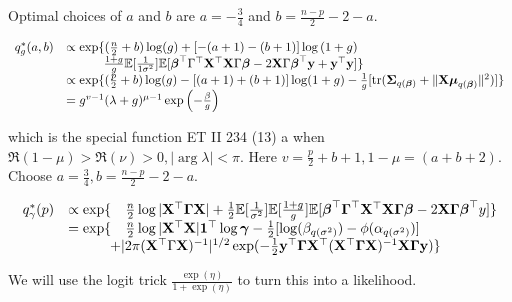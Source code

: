 \documentclass{amsart}[12pt]
\begin{document}
Optimal choices of $a$ and $b$ are $a = -\frac{3}{4}$ and $b=\frac{n-p}{2} - 2 - a$.

\begin{equation*}
	\begin{array}{rl}
		q^*_g(a, b) & \propto \exp \{(\frac{n}{2} + b) \log (g) + [-(a + 1) - (b + 1)] \log{(1 + g)}                                                                                 \\
		            & \qquad \quad \frac{1 + g}{g} \mathbb{E} [\frac{1}{1 \sigma^2}] \mathbb{E}[{\boldsymbol \beta}^\top \Gamma^\top {\bf X}^\top {\bf X} \Gamma {\boldsymbol\beta} - 2 {\bf X} \Gamma {\boldsymbol\beta}^\top {\bf y} + {\bf y}^\top {\bf y}] \} \\
		            & \propto \exp \{ (\frac{p}{2} + b) \log (g) - [(a + 1) + (b + 1)] \log (1 + g) - \frac{1}{g}[\text{tr}({\boldsymbol \Sigma}_{q({\boldsymbol \beta})} + \| {\bf X} {\boldsymbol \mu}_{q({\boldsymbol \beta})} \|^2)] \}        \\
		            & = g^{v-1} (\lambda + g)^{\mu - 1} \exp{\left (-\frac{\beta}{g}\right )}                                                                                        
	\end{array}
\end{equation*}

which is the special function ET II 234 (13) a when $\Re(1 - \mu) > \Re(\nu) > 0, | \arg \lambda | < \pi$. Here
$v = \frac{p}{2} + b + 1, 1 - \mu = (a + b + 2)$. Choose $a = \frac{3}{4}, b = \frac{n - p}{2} - 2 - a$.

\begin{equation*}
	\begin{array}{rl}
		q^*_\gamma (p) & \propto \exp \{ \quad \frac{n}{2} \log |{\bf X}^\top {\boldsymbol\Gamma} {\bf X}|                                                                                 
		+ \tfrac{1}{2} \mathbb{E}[\frac{1}{\sigma^2}] \mathbb{E}[\frac{1 + g}{g}] 
		\mathbb{E}[{\boldsymbol \beta}^\top {\boldsymbol\Gamma}^\top {\bf X}^\top {\bf X} {\boldsymbol\Gamma} {\boldsymbol\beta} - 2 {\bf X} {\boldsymbol \Gamma} {\boldsymbol \beta}^\top y]\} \\
		               & = \exp \{\quad \frac{n}{2} \log{|{\bf X}^\top {\bf X}|} {\bf1}^\top \log {\boldsymbol\gamma} - \tfrac{1}{2} [\log (\beta_{q(\sigma^2)}) - \phi(\alpha_{q(\sigma^2)})]     \\
		               & \qquad \quad + |2 \pi ({\bf X}^\top \Gamma {\bf X})^{-1}|^{1/2} \exp(-\tfrac{1}{2} {\bf y}^\top {\boldsymbol\Gamma} {\bf X}^\top ({\bf X}^\top {\boldsymbol\Gamma} {\bf X})^{-1} {\bf X} {\boldsymbol \Gamma} {\bf y}) \} 
	\end{array}
\end{equation*}

We will use the logit trick $\frac{\exp(\eta)}{1 + \exp(\eta)}$ to turn this into a likelihood.
\end{document}
